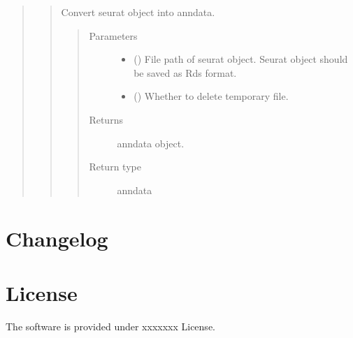 \documentclass[letterpaper,10pt,english]{sphinxmanual}
\begin{document}
\begin{quote}
\begin{quote}
\begin{fulllineitems}
\label{\detokenize{modules/celloracle.data_conversion:celloracle.data_conversion.seurat_object_to_anndata}}
Convert seurat object into anndata.
\begin{quote}\begin{description}
\item[{Parameters}] \leavevmode\begin{itemize}
\item {} 
 () \textendash{} File path of seurat object. Seurat object should be saved as Rds format.

\item {} 
 () \textendash{} Whether to delete temporary file.

\end{itemize}

\item[{Returns}] \leavevmode
anndata object.

\item[{Return type}] \leavevmode
anndata

\end{description}\end{quote}

\end{fulllineitems}

\end{quote}
\end{quote}


\section{Changelog}
\label{\detokenize{changelog:changelog}}\label{\detokenize{changelog:id1}}\label{\detokenize{changelog::doc}}

\section{License}
\label{\detokenize{license/index:license}}\label{\detokenize{license/index:id1}}\label{\detokenize{license/index::doc}}
The software is provided under xxxxxxx License.
\end{document}
